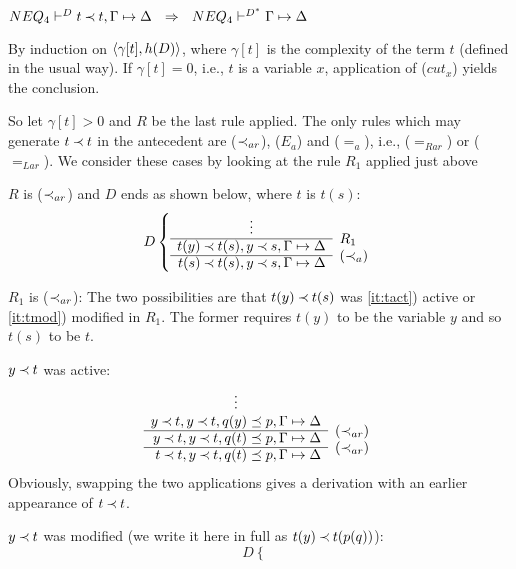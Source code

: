 \begin{LEMMA}\label{le:nott} ${NEQ_4}\vdash^{{D}}t\mathbin{\prec} t,\Gamma\mathrel{\mapsto}\Delta  
\ \ \Rightarrow \ \ {NEQ_4}\vdash^{{D^*}}\Gamma\mathrel{\mapsto}\Delta$
\end{LEMMA}
\begin{PROOF} 
By induction on $\langle\gamma[t],h(D)\rangle$, where $\gamma[t]$ is the complexity of 
the term $t$ (defined in the usual way). 
If $\gamma[t]=0$, i.e., $t$ is a variable $x$,  application of ($cut_x$) yields the conclusion.

So let $\gamma[t]>0$ and $R$ be the last rule applied.
 The only rules which may generate $t\mathbin{\prec} t$ in the antecedent
are ($\mathbin{\prec}_{ar}$), ($E_a$) and ($=_a$), i.e., ($=_{Rar}$) or
($=_{Lar}$). We consider these cases by looking at the rule $R_1$ applied just above
%
\begin{LS}
\item $R$ is ($\mathbin{\prec}_{ar}$) and $D$ ends as shown below, where $t$ is $t(s)$:
\[ D \left \{ \begin{array}{rl}
\multicolumn{1}{c}{\vdots} \\ \cline{1-1}
t(y)\Incl t(s), y\Incl s, \Gamma\Seq\Delta & \rabove{R_1} \\ \cline{1-1}
t(s) \Incl t(s), y\Incl s, \GSD & \rabove{(\Incl_a)} \end{array} \right .\]
%
\begin{LSA}
\item $R_1$ is ($\mathbin{\prec}_{ar}$): The two possibilities are that $t(y)\mathbin{\prec} t(s)$ was
\ref{it:tact}) active
or \ref{it:tmod}) modified in $R_1$. The former requires $t(y)$ to be the variable
 $y$ and so $t(s)$ to be $t$.
\begin{LSB}
\item\label{it:tact} $y\mathbin{\prec} t$ was active:
\[ \begin{array}{rl}
\multicolumn{1}{c}{\vdots} \\ 
y\Incl t, y\Incl t, q(y)\preceq p, \Gamma\Seq\Delta  \\ \cline{1-1}
y\Incl t, y\Incl t, q(t)\preceq p, \Gamma\Seq\Delta & \rabove{(\Incl_{ar})} \\ \cline{1-1}
t\Incl t, y\Incl t, q(t)\preceq p, \GSD & \rabove{(\Incl_{ar})} \end{array} \]
Obviously, swapping the two applications gives a derivation with an earlier
appearance of $t\mathbin{\prec} t$. 
%
\item\label{it:tmod} $y\mathbin{\prec} t$ was modified (we write it here in full as $t(y)\mathbin{\prec} t(p(q))$):
\[ D \left \{ \begin{array}{rl}

\end{array}\]
\end{LSB}
\end{LSA}
\end{LS}
\end{PROOF}
